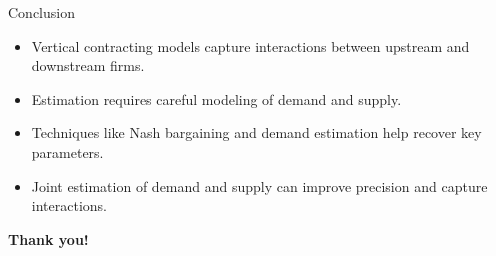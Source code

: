 \documentclass[aspectratio=169]{beamer}  %
\begin{document}
\begin{frame}{Conclusion}
    \begin{itemize}
        \item Vertical contracting models capture interactions between upstream and downstream firms.
        \item Estimation requires careful modeling of demand and supply.
        \item Techniques like Nash bargaining and demand estimation help recover key parameters.
        \item Joint estimation of demand and supply can improve precision and capture interactions.
    \end{itemize}

    \vspace{0.5cm}
    \begin{center}
        \textbf{Thank you!}
    \end{center}
\end{frame}
\end{document}
